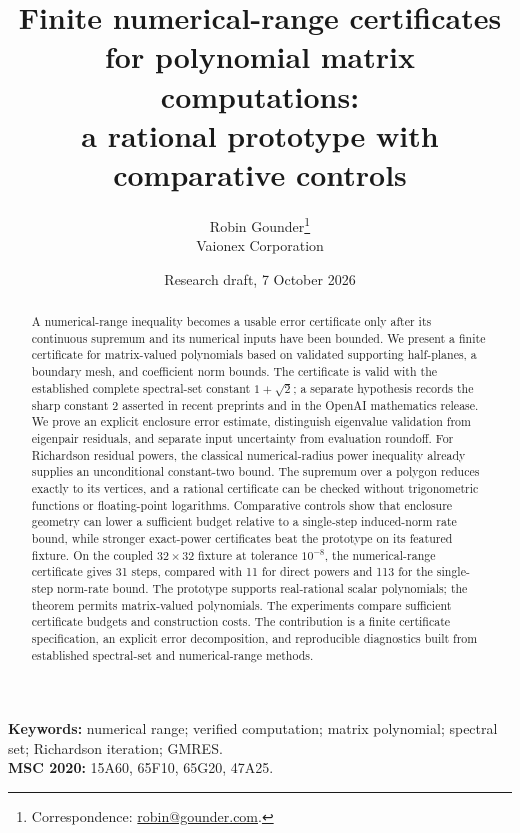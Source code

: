 \documentclass[11pt]{article}
\title{Finite numerical-range certificates for polynomial matrix computations:\\
a rational prototype with comparative controls}
\author{Robin Gounder\thanks{Correspondence: \href{mailto:robin@gounder.com}{robin@gounder.com}.}\\{\small Vaionex Corporation}}
\date{Research draft, 7 October 2026}
\theoremstyle{definition}
\theoremstyle{remark}
\numberwithin{equation}{section}
\begin{document}
\maketitle
\begin{abstract}
A numerical-range inequality becomes a usable error certificate only after
its continuous supremum and its numerical inputs have been bounded.
We present a finite certificate for matrix-valued polynomials based on
validated supporting half-planes, a boundary mesh, and coefficient norm
bounds. The certificate is valid with the established complete spectral-set
constant \(1+\sqrt{2}\); a separate hypothesis records the sharp constant
\(2\) asserted in recent preprints and in the OpenAI mathematics release.
We prove an explicit enclosure error estimate, distinguish eigenvalue
validation from eigenpair residuals, and separate input uncertainty from
evaluation roundoff. For Richardson residual powers, the classical numerical-radius power
inequality already supplies an unconditional constant-two bound. The
supremum over a polygon reduces exactly to its vertices, and a rational
certificate can be checked without trigonometric functions or
floating-point logarithms.
Comparative controls show that enclosure geometry can lower a sufficient
budget relative to a single-step induced-norm rate bound, while stronger
exact-power certificates beat the prototype on its featured fixture.
On the coupled \(32\times32\) fixture at tolerance \(10^{-8}\), the
numerical-range certificate gives 31 steps, compared with 11 for direct
powers and 113 for the single-step norm-rate bound. The prototype supports
real-rational scalar polynomials; the theorem permits matrix-valued
polynomials. The experiments compare sufficient certificate budgets and
construction costs. The contribution is a finite certificate specification,
an explicit error decomposition, and reproducible diagnostics built from
established spectral-set and numerical-range methods.
\end{abstract}
\noindent\textbf{Keywords:} numerical range; verified computation;
matrix polynomial; spectral set; Richardson iteration; GMRES.\\
\textbf{MSC 2020:} 15A60, 65F10, 65G20, 47A25.
\end{document}

